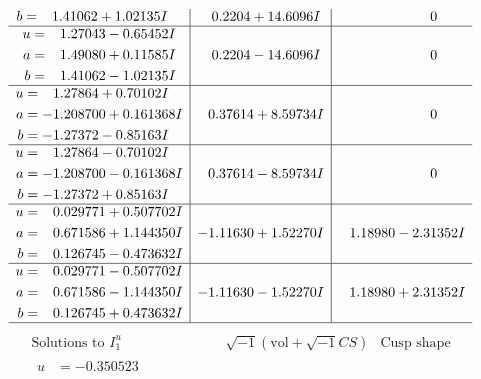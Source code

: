 \documentclass[1p]{elsarticle_modified}
\theoremstyle{definition}
\newcommand{\I}{\sqrt{-1}}
\begin{document}
$$\begin{array}{c|c|c}
\begin{aligned}
b &= \phantom{-}1.41062 + 1.02135 I\end{aligned}
 & \phantom{-}0.2204 + 14.6096 I & \phantom{-0.000000 } 0 \\ \hline\begin{aligned}
u &= \phantom{-}1.27043 - 0.65452 I \\
a &= \phantom{-}1.49080 + 0.11585 I \\
b &= \phantom{-}1.41062 - 1.02135 I\end{aligned}
 & \phantom{-}0.2204 - 14.6096 I & \phantom{-0.000000 } 0 \\ \hline\begin{aligned}
u &= \phantom{-}1.27864 + 0.70102 I \\
a &= -1.208700 + 0.161368 I \\
b &= -1.27372 - 0.85163 I\end{aligned}
 & \phantom{-}0.37614 + 8.59734 I & \phantom{-0.000000 } 0 \\ \hline\begin{aligned}
u &= \phantom{-}1.27864 - 0.70102 I \\
a &= -1.208700 - 0.161368 I \\
b &= -1.27372 + 0.85163 I\end{aligned}
 & \phantom{-}0.37614 - 8.59734 I & \phantom{-0.000000 } 0 \\ \hline\begin{aligned}
u &= \phantom{-}0.029771 + 0.507702 I \\
a &= \phantom{-}0.671586 + 1.144350 I \\
b &= \phantom{-}0.126745 - 0.473632 I\end{aligned}
 & -1.11630 + 1.52270 I & \phantom{-}1.18980 - 2.31352 I \\ \hline\begin{aligned}
u &= \phantom{-}0.029771 - 0.507702 I \\
a &= \phantom{-}0.671586 - 1.144350 I \\
b &= \phantom{-}0.126745 + 0.473632 I\end{aligned}
 & -1.11630 - 1.52270 I & \phantom{-}1.18980 + 2.31352 I\\
 \hline 
 \end{array}$$\newpage$$\begin{array}{c|c|c}  
\text{Solutions to }I^u_{1}& \I (\text{vol} + \sqrt{-1}CS) & \text{Cusp shape}\\
 \hline 
\begin{aligned}
u &= -0.350523\phantom{ +0.000000I} \\

\end{aligned}
\end{array}$$
\end{document}
